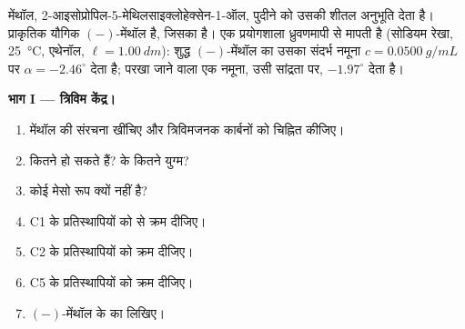 \begin{problem}
\label{pb:b1:stereochemistry-in-depth:1}
मेंथॉल, 2-आइसोप्रोपिल-5-मेथिलसाइक्लोहेक्सेन-1-ऑल, पुदीने को उसकी शीतल
अनुभूति देता है। प्राकृतिक यौगिक $(-)$-मेंथॉल है, जिसका 
 है। एक प्रयोगशाला ध्रुवणमापी से मापती है (सोडियम रेखा,
\qty{25}{\celsius}, एथेनॉल, $\ell = \qty{1.00}{dm}$): शुद्ध $(-)$-मेंथॉल का उसका संदर्भ नमूना
$c = \qty{0.0500}{g/mL}$ पर $\alpha =
-2.46^\circ$ देता है; परखा जाने वाला एक नमूना, उसी सांद्रता पर,
$-1.97^\circ$ देता है।

\medskip
\noindent\textbf{भाग I --- त्रिविम केंद्र।}
\begin{enumerate}
  \item मेंथॉल की संरचना खींचिए और त्रिविमजनक कार्बनों को चिह्नित कीजिए।
  \item कितने  हो सकते हैं?  के कितने
        युग्म?
  \item कोई मेसो रूप क्यों नहीं है?
  \item C1 के प्रतिस्थापियों को  से क्रम दीजिए।
  \item C2 के प्रतिस्थापियों को क्रम दीजिए।
  \item C5 के प्रतिस्थापियों को क्रम दीजिए।
  \item $(-)$-मेंथॉल के  का  लिखिए।
\end{enumerate}


\end{problem}
